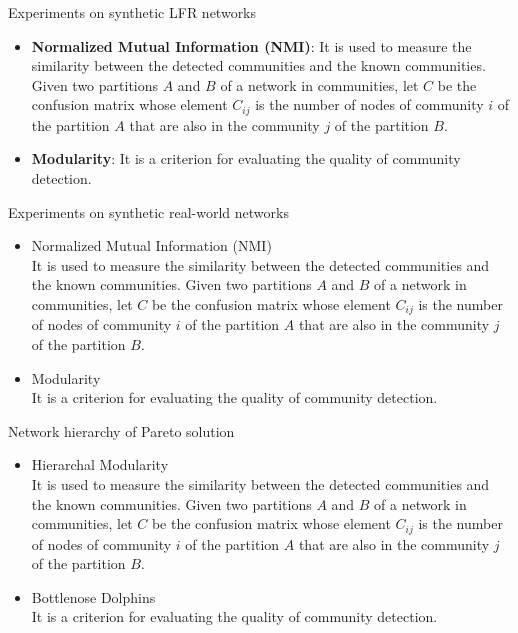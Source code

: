 \documentclass[aspectratio=169,xcolor=dvipsnames]{beamer}
\begin{document}

\begin{frame}{Experiments on synthetic LFR networks}
    \begin{itemize}
        \item \textbf{Normalized Mutual Information (NMI)}: It is used to measure the similarity between the detected communities and the known communities. Given two partitions $A$ and $B$ of a network in communities, let $C$ be the confusion matrix whose element $C_{ij}$ is the number of nodes of community $i$ of the partition $A$ that are also in the community $j$ of the partition $B$.
        \item \textbf{Modularity}: It is a criterion for evaluating the quality of community detection.
    \end{itemize}
\end{frame}


\begin{frame}{Experiments on synthetic real-world networks}
    \begin{itemize}
        \item Normalized Mutual Information (NMI) \\
        It is used to measure the similarity between the detected communities and the known communities. Given two partitions $A$ and $B$ of a network in communities, let $C$ be the confusion matrix whose element $C_{ij}$ is the number of nodes of community $i$ of the partition $A$ that are also in the community $j$ of the partition $B$.
        \item Modularity \\
        It is a criterion for evaluating the quality of community detection.
    \end{itemize}
\end{frame}


\begin{frame}{Network hierarchy of Pareto solution}
    \begin{itemize}
        \item Hierarchal Modularity \\
        It is used to measure the similarity between the detected communities and the known communities. Given two partitions $A$ and $B$ of a network in communities, let $C$ be the confusion matrix whose element $C_{ij}$ is the number of nodes of community $i$ of the partition $A$ that are also in the community $j$ of the partition $B$.
        \item Bottlenose Dolphins \\
        It is a criterion for evaluating the quality of community detection.
    \end{itemize}
\end{frame}
\end{document}
